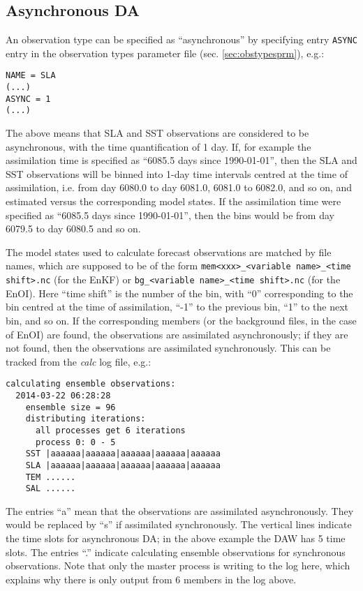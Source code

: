 \documentclass[11pt]{report}
\begin{document}
\subsection{Asynchronous DA}
\label{sec:async}

An observation type can be specified as ``asynchronous'' by specifying entry \verb|ASYNC| entry in the observation types parameter file (sec. \ref{sec:obstypesprm}), e.g.:
\begin{Verbatim}[frame=single,fontsize=\footnotesize]
NAME = SLA
(...)
ASYNC = 1
(...)
\end{Verbatim}
The above means that SLA and SST observations are considered to be asynchronous, with the time quantification of 1 day.
If, for example the assimilation time is specified as ``6085.5 days since 1990-01-01'', then the SLA and SST observations will be binned into 1-day time intervals centred at the time of assimilation, i.e. from day 6080.0 to day 6081.0, 6081.0 to 6082.0, and so on, and estimated versus the corresponding model states.
If the assimilation time were specified as ``6085.5 days since 1990-01-01'', then the bins would be from day 6079.5 to day 6080.5 and so on.

The model states used to calculate forecast observations are matched by file names, which are supposed to be of the form \verb|mem<xxx>_<variable name>_<time shift>.nc| (for the EnKF) or \verb|bg_<variable name>_<time shift>.nc| (for the EnOI).
Here ``time shift'' is the number of the bin, with ``0'' corresponding to the bin centred at the time of assimilation, ``-1'' to the previous bin, ``1'' to the next bin, and so on.
If the corresponding members (or the background files, in the case of EnOI) are found, the observations are assimilated asynchronously; if they are not found, then the observations are assimilated synchronously.
This can be tracked from the \emph{calc} log file, e.g.:
\begin{Verbatim}[frame=single,fontsize=\footnotesize]
  calculating ensemble observations:
  2014-03-22 06:28:28
    ensemble size = 96
    distributing iterations:
      all processes get 6 iterations
      process 0: 0 - 5
    SST |aaaaaa|aaaaaa|aaaaaa|aaaaaa|aaaaaa
    SLA |aaaaaa|aaaaaa|aaaaaa|aaaaaa|aaaaaa
    TEM ......
    SAL ......
\end{Verbatim}
The entries ``a'' mean that the observations are assimilated asynchronously.
They would be replaced by ``s'' if assimilated synchronously.
The vertical lines indicate the time slots for asynchronous DA; in the above example the DAW has 5 time slots.
The entries ``.'' indicate calculating ensemble observations for synchronous observations.
Note that only the master process is writing to the log here, which explains why there is only output from 6 members in the log above.
\end{document}
